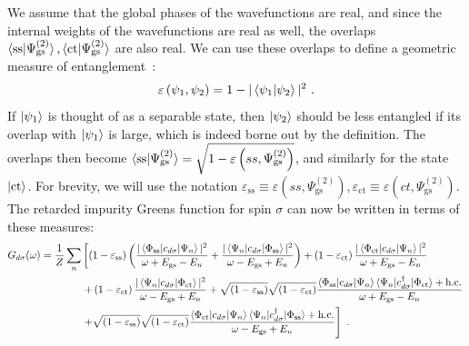 We assume that the global phases of the wavefunctions are real, and since the internal weights of the wavefunctions are real as well, the overlaps \(\braket{\text{ss}|\Psi^{(2)}_\text{gs}},\braket{\text{ct}|\Psi^{(2)}_\text{gs}}\) are also real. We can use these overlaps to define a geometric measure of entanglement~\cite{shimony1995degree,wei2003geometric,horodecki2009quantum}:
\begin{eqnarray}
	\varepsilon\left(\psi_1,\psi_2\right) = 1 - |\braket{\psi_1 | \psi_2}|^2~.
\end{eqnarray}
If \(\ket{\psi_1}\) is thought of as a separable state, then \(\ket{\psi_2}\) should be less entangled if its overlap with \(\ket{\psi_1}\) is large, which is indeed borne out by the definition.
The overlaps then become \(\braket{\text{ss}|\Psi^{(2)}_\text{gs}} = \sqrt{1 - \varepsilon\left(ss,\Psi^{(2)}_\text{gs}\right)}\), and similarly for the state \(\ket{\text{ct}}\). For brevity, we will use the notation \(\varepsilon_\text{ss} \equiv \varepsilon\left(ss,\Psi^{(2)}_\text{gs}\right), \varepsilon_\text{ct} \equiv \varepsilon\left(ct,\Psi^{(2)}_\text{gs}\right)\). The retarded impurity Greens function for spin \(\sigma\) can now be written in terms of these measures:
\begin{eqnarray}\label{greens_func_entng}
	G_{d\sigma}(\omega) = \frac{1}{Z}\sum_n &\left[\left(1 - \varepsilon_\text{ss} \right) \left(\frac{|\braket{\Phi_\text{ss} | c_{d\sigma} | \Psi_n}|^2}{\omega + E_\text{gs} - E_n} + \frac{|\braket{\Psi_n | c_{d\sigma} | \Phi_\text{ss}}|^2}{\omega - E_\text{gs} + E_n}\right) + \left(1 - \varepsilon_\text{ct} \right) \frac{|\braket{\Phi_\text{ct} | c_{d\sigma} | \Psi_n}|^2}{\omega + E_\text{gs} - E_n}\right.\nonumber\\
		&\left. + \left(1 - \varepsilon_\text{ct} \right)\frac{|\braket{\Psi_n | c_{d\sigma} | \Phi_\text{ct}}|^2}{\omega - E_\text{gs} + E_n} + \sqrt{\left(1 - \varepsilon_\text{ss} \right)}\sqrt{\left(1 - \varepsilon_\text{ct} \right)} \frac{\braket{\Phi_\text{ss} | c_{d\sigma} | \Psi_n}\braket{\Psi_n | c^\dagger_{d\sigma} | \Phi_\text{ct}} + \text{h.c.}}{\omega + E_\text{gs} - E_n} \right. \nonumber\\
		&\left.+ \sqrt{\left(1 - \varepsilon_\text{ss} \right)}\sqrt{\left(1 - \varepsilon_\text{ct} \right)}\frac{\braket{\Phi_\text{ct} | c_{d\sigma} | \Psi_n}\braket{\Psi_n | c^\dagger_{d\sigma} | \Phi_\text{ss}} + \text{h.c.}}{\omega - E_\text{gs} + E_n}\right]~.
\end{eqnarray}

